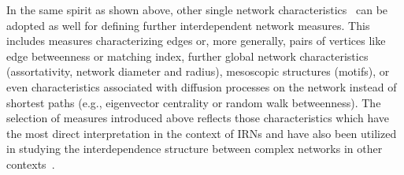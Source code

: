\documentclass[graybox]{svmult}
\begin{document}

In the same spirit as shown above, other single network characteristics~\cite{Boccaletti2006,Costa2007} can be adopted as well for defining further interdependent network measures. This includes measures characterizing edges or, more generally, pairs of vertices like edge betweenness or matching index, further global network characteristics (assortativity, network diameter and radius), mesoscopic structures (motifs), or even characteristics associated with diffusion processes on the network instead of shortest paths (e.g., eigenvector centrality or random walk betweenness). The selection of measures introduced above reflects those characteristics which have the most direct interpretation in the context of IRNs and have also been utilized in studying the interdependence structure between complex networks in other contexts~\cite{Donges2011EPJB,Wiedermann2013}. %
\end{document}
